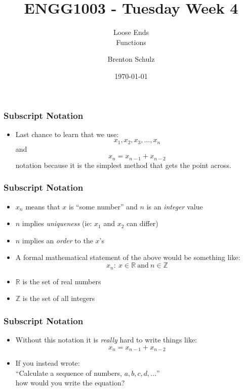 \documentclass[14pt]{beamer}
\title{ENGG1003 - Tuesday Week 4}
\subtitle{Loose Ends \\ Functions}
\author{Brenton Schulz}
\institute{University of Newcastle}
\date{\today}
\begin{document}
\titlepage

\begin{frame}
\frametitle{Subscript Notation}
\begin{itemize}
\item Last chance to learn that we use:
\begin{equation}
x_1, x_2, x_3, ... , x_n
\end{equation}
and
\begin{equation}
x_n = x_{n-1} + x_{n-2}
\end{equation}
notation because it is the simplest method that gets the point across.
\end{itemize}
\end{frame}

\begin{frame}[fragile]
\frametitle{Subscript Notation}
\begin{itemize}
\item $x_n$ means that $x$ is ``some number'' and $n$ is an \textit{integer} value
\item $n$ implies \textit{uniqueness} (ie: $x_1$ and $x_2$ can differ)
\item $n$ implies an \textit{order} to the $x$'s
\item A formal mathematical statement of the above would be something like:
\begin{equation}
x_n :~x \in \mathbb{R}~\textrm{and} ~ n \in \mathbb{Z}
\end{equation}
\item $\mathbb{R}$ is the set of real numbers
\item $\mathbb{Z}$ is the set of all integers
\end{itemize}
\end{frame}

\begin{frame}[fragile]
\frametitle{Subscript Notation}
\begin{itemize}
\item Without this notation it is \textit{really} hard to write things like:
\begin{equation}
x_n = x_{n-1} + x_{n-2}
\end{equation}
\pause
\item If you instead wrote:\\
``Calculate a sequence of numbers, $a,b,c,d,...$''\\
how would you write the equation?
\end{itemize}
\end{frame}
\end{document}
